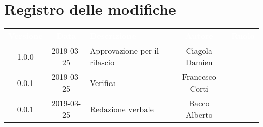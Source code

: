 \section*{Registro delle modifiche}
{
	\renewcommand{\arraystretch}{1.5}
	\centering
	\begin{longtable}{ c c  C{4cm}  c  c }
		
		\textcolor{white}{\textbf{Versione}} & \textcolor{white}{\textbf{Data}} & \textcolor{white}{\textbf{Descrizione}} & \textcolor{white}{\textbf{Autore}} & \textcolor{white}{\textbf{Ruolo}}\\
		1.0.0 & 2019-03-25 & Approvazione per il rilascio & Ciagola Damien & \Res{}\\
		0.0.1 & 2019-03-25 & Verifica & Francesco Corti & \ver{}\\
		0.0.1 & 2019-03-25 & Redazione verbale & Bacco Alberto & \reda{}\\
		
		
	\end{longtable}
	
}